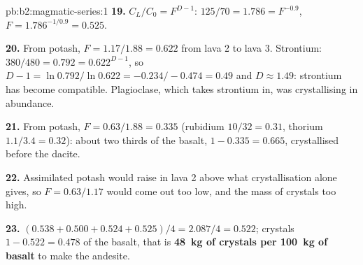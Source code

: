 \begin{solution}{pb:b2:magmatic-series:1}
\textbf{19.} $C_L/C_0 = F^{D - 1}$: $125/70 = 1.786 = F^{-0.9}$, $F = 1.786^{-1/0.9} =
0.525$.

\textbf{20.} From potash, $F = 1.17/1.88 = 0.622$ from lava 2 to lava 3. Strontium:
$380/480 = 0.792 = 0.622^{D - 1}$, so $D - 1 = \ln 0.792/\ln 0.622 = -0.234/-0.474 =
0.49$ and $D \approx 1.49$: strontium has become compatible. Plagioclase, which takes
strontium in, was crystallising in abundance.

\textbf{21.} From potash, $F = 0.63/1.88 = 0.335$ (rubidium $10/32 = 0.31$, thorium
$1.1/3.4 = 0.32$): about two thirds of the basalt, $1 - 0.335 = 0.665$, crystallised
before the dacite.

\textbf{22.} Assimilated potash would raise  in lava 2 above what
crystallisation alone gives, so $F = 0.63/1.17$ would come out too low, and the mass of
crystals too high.

\textbf{23.} $(0.538 + 0.500 + 0.524 + 0.525)/4 = 2.087/4 = 0.522$; crystals $1 - 0.522
= 0.478$ of the basalt, that is \textbf{\qty[text-series-to-math=true]{48}{kg} of
crystals per \qty{100}{kg} of basalt} to make the andesite.
\end{solution}
